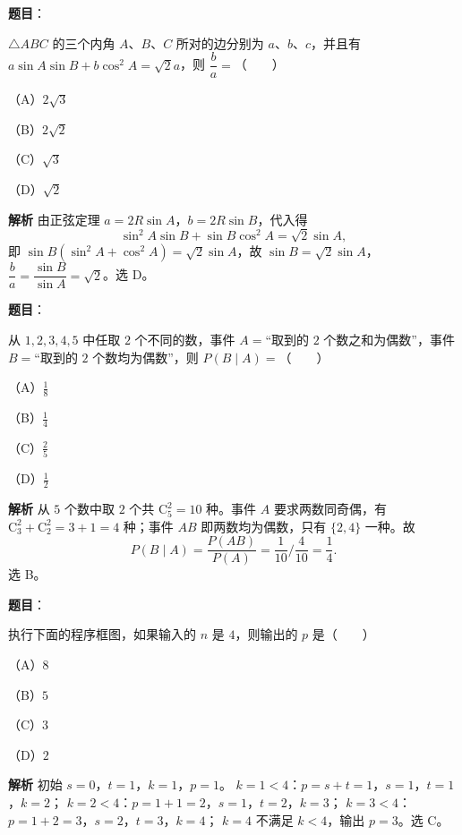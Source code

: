 \begin{answer}

\textbf{题目}：

$\triangle ABC$ 的三个内角 $A$、$B$、$C$ 所对的边分别为 $a$、$b$、$c$，并且有 $a\sin A\sin B+b\cos^2A=\sqrt2a$，则 $\dfrac ba=$\mbox{（　　）}

（A）$2\sqrt3$

（B）$2\sqrt2$

（C）$\sqrt3$

（D）$\sqrt2$

\textbf{解析}
由正弦定理 $a=2R\sin A$，$b=2R\sin B$，代入得
\nopagebreak[4]
\[\sin^2A\sin B+\sin B\cos^2A=\sqrt2\sin A,\]
即 $\sin B(\sin^2A+\cos^2A)=\sqrt2\sin A$，故 $\sin B=\sqrt2\sin A$，$\dfrac ba=\dfrac{\sin B}{\sin A}=\sqrt2$。选 D。


\end{answer}
\begin{answer}

\textbf{题目}：

从 $1,2,3,4,5$ 中任取 $2$ 个不同的数，事件 $A=$“取到的 $2$ 个数之和为偶数”，事件 $B=$“取到的 $2$ 个数均为偶数”，则 $P(B\mid A)=$\mbox{（　　）}

（A）$\frac18$

（B）$\frac14$

（C）$\frac25$

（D）$\frac12$

\textbf{解析}
从 $5$ 个数中取 $2$ 个共 $\mathrm C_5^2=10$ 种。事件 $A$ 要求两数同奇偶，有 $\mathrm C_3^2+\mathrm C_2^2=3+1=4$ 种；事件 $AB$ 即两数均为偶数，只有 $\{2,4\}$ 一种。故
\nopagebreak[4]
\[P(B\mid A)=\frac{P(AB)}{P(A)}=\frac1{10}\Big/\frac4{10}=\frac14.\]
选 B。


\end{answer}
\begin{answer}

\textbf{题目}：

执行下面的程序框图，如果输入的 $n$ 是 $4$，则输出的 $p$ 是\mbox{（　　）}

（A）$8$

（B）$5$

（C）$3$

（D）$2$
\nopagebreak[4]
\begin{center}\end{center}
\nopagebreak[4]
\textbf{解析}
初始 $s=0$，$t=1$，$k=1$，$p=1$。
$k=1<4$：$p=s+t=1$，$s=1$，$t=1$，$k=2$；
$k=2<4$：$p=1+1=2$，$s=1$，$t=2$，$k=3$；
$k=3<4$：$p=1+2=3$，$s=2$，$t=3$，$k=4$；
$k=4$ 不满足 $k<4$，输出 $p=3$。选 C。


\end{answer}

